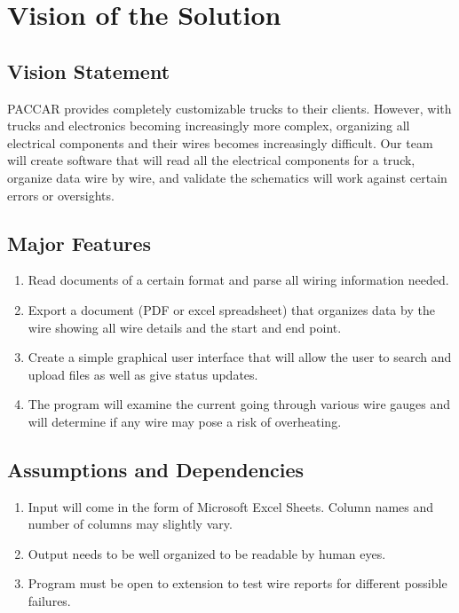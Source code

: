 \section{Vision of the Solution}
\subsection{Vision Statement}
    PACCAR provides completely customizable trucks to their clients. However, with trucks and electronics becoming increasingly more complex, organizing all electrical components and their wires becomes increasingly difficult. Our team will create software that will read all the electrical components for a truck, organize data wire by wire, and validate the schematics will work against certain errors or oversights.  

\subsection{Major Features}
\begin{enumerate}
    \item Read documents of a certain format and parse all wiring information needed.
    \item Export a document (PDF or excel spreadsheet) that organizes data by the wire showing all wire details and the start and end point.
    \item Create a simple graphical user interface that will allow the user to search and upload files as well as give status updates.
    \item The program will examine the current going through various wire gauges and will determine if any wire may pose a risk of overheating.
\end{enumerate}

\subsection{Assumptions and Dependencies}  
\begin{enumerate}
    \item Input will come in the form of Microsoft Excel Sheets. Column names and number of columns may slightly vary. 
    \item Output needs to be well organized to be readable by human eyes. 
    \item Program must be open to extension to test wire reports for different possible failures.
\end{enumerate}



